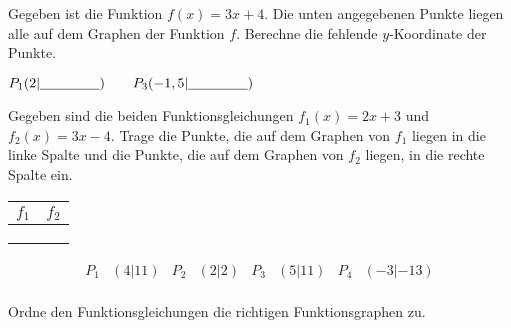 \documentclass[addpoints,11pt]{exam}
\begin{document}
\begin{questions}
\droptotalpoints

\question[2]
Gegeben ist die Funktion $f(x)=3x+4$. Die unten angegebenen Punkte liegen alle auf dem Graphen der Funktion $f$. Berechne die fehlende $y$-Koordinate der Punkte. 

$P_1(2|\underline{\hspace*{1.5cm}}) \qquad P_3(-1,5|\underline{\hspace*{1.5cm}}) $

\droptotalpoints

\question[3]

Gegeben sind die beiden Funktionsgleichungen $f_1(x)=2x+3$ und $f_2(x)=3x-4$. Trage die Punkte, die auf dem Graphen von $f_1$ liegen in die linke Spalte und die Punkte, die auf dem Graphen von $f_2$ liegen, in die rechte Spalte ein.
\begin{table}[h!]
\centering
\begin{tabular}{|M{3.2cm}|M{3.2cm}|}
\hline
{}
$f_1$ & $f_2$ \\ \hline
                      &           \\ \hline
                      &           \\ \hline
                      &           \\ \hline
\end{tabular}
\end{table}
\begin{align*}
P_1&(4|11)  &  P_2&(2|2)    &  P_3&(5|11) &  P_4&(-3|-13) \\
\end{align*}
\droptotalpoints

\question[4]
Ordne den Funktionsgleichungen die richtigen Funktionsgraphen zu. 


\end{questions}
\end{document}
